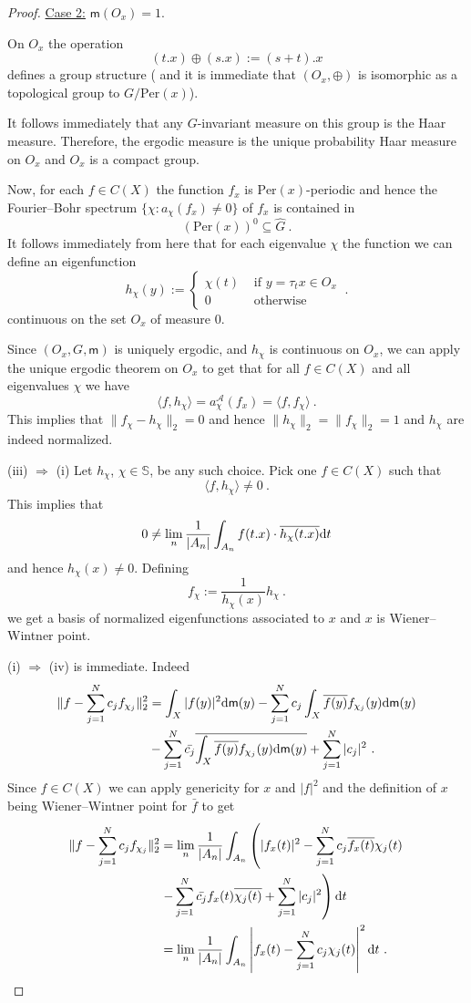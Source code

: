\documentclass[10pt,a4paper]{amsart}
\newcommand{\Per}{\mbox{Per} }
\newcommand{\SSS}{\mathbb S}
\newcommand{\cA}{{\mathcal A}}
\newcommand{\dd}{\mbox{\rm d}}
\newcommand{\mm}{\mathsf{m}}
\begin{document}
\begin{proof}
\underline{Case 2:} $\mm(O_{x})=1$.

On $O_{x}$ the operation
\[
(t.x) \oplus (s.x) := (s+t).x
\]
defines a group structure ( and it is immediate that $(O_{x}, \oplus)$ is isomorphic as a topological group to $G/\Per(x)$).

It follows immediately that any $G$-invariant measure on this group is the Haar measure. Therefore, the ergodic measure is the unique probability Haar measure on $O_x$ and $O_x$ is a compact group.

Now, for each $f \in C(X)$ the function $f_x$ is $\Per(x)$-periodic and hence the Fourier--Bohr spectrum $\{ \chi : a_\chi(f_x) \neq 0 \}$ of $f_x$ is contained in
\[
(\Per(x))^0 \subseteq \widehat{G} \ .
\]
It follows immediately from here that for each eigenvalue $\chi$ the function we can define an eigenfunction
\[
h_\chi(y):=
\left\{
\begin{array}{cc}
  \chi(t) & \mbox{ if } y =\tau_t x \in O_{x} \\
  0 &\mbox{ otherwise }
\end{array}
\right. \ .
\]
continuous on the set $O_x$ of measure $0$.

Since $(O_x, G, \mm)$ is uniquely ergodic, and $h_\chi$ is continuous on $O_x$, we can apply the unique ergodic theorem on $O_x$ to get that for all $f \in C(X)$ and all eigenvalues $\chi$ we have
\[
\langle f, h_\chi \rangle =a_\chi^\cA(f_x) = \langle f, f_\chi \rangle \ .
\]
This implies that $\| f_\chi-h_\chi \|_2=0$ and hence $\| h_\chi \|_2=\|f_\chi\|_2=1$ and $h_\chi$ are indeed normalized.

\medskip
\noindent (iii) $\Longrightarrow$ (i) Let $h_\chi$, $\chi \in \SSS$,  be any such choice. Pick one $f \in C(X)$ such that
\[
\langle f, h_\chi \rangle \neq 0 \ .
\]
This implies that
\[
0\neq \lim_n \frac{1}{|A_n|} \int_{A_n} f(t.x) \cdot \overline{h_\chi(t.x)} \dd t
\]
and hence $h_\chi(x) \neq 0$.
Defining
\[
f_\chi:= \frac{1}{h_\chi(x)} h_\chi \ .
\]
we get a basis of normalized eigenfunctions associated to $x$ and $x$ is Wiener--Wintner point.


\noindent (i) $\Longrightarrow$ (iv) is immediate. Indeed
\begin{align*}
\| f- \sum_{j=1}^N c_j f_{\chi_j} \|^2_2 &= \int_{X} |f(y)|^2 \dd \mm(y)- \sum_{j=1}^N c_j \int_{X} \overline{ f(y)} f_{\chi_j}(y) \dd \mm(y)\\
&- \sum_{j=1}^N \bar{c_j} \overline{ \int_{X} \overline{ f(y)} f_{\chi_j}(y) \dd \mm(y)} + \sum_{j=1}^N |c_j|^2 \ .
\end{align*}
Since $f\in C(X)$ we can apply genericity for $x$ and $|f|^2$ and the definition of $x$ being Wiener--Wintner point for $\bar{f}$ to get
\begin{align*}
\| f- \sum_{j=1}^N c_j f_{\chi_j} \|^2_2&= \lim_n \frac{1}{|A_n|} \int_{A_n} \left(|f_x(t)|^2 - \sum_{j=1}^N c_j \overline{f_x(t)} \chi_j(t) \right. \\
&\left. -\sum_{j=1}^N \bar{c_j} f_x(t) \overline{\chi_j(t)} + \sum_{j=1}^N |c_j|^2 \right) \dd t\\
&= \lim_n  \frac{1}{|A_n|} \int_{A_n} \left|f_x(t) - \sum_{j=1}^N c_j \chi_j(t)  \right|^2 \dd t \ .
\end{align*}


\end{proof}
\end{document}
